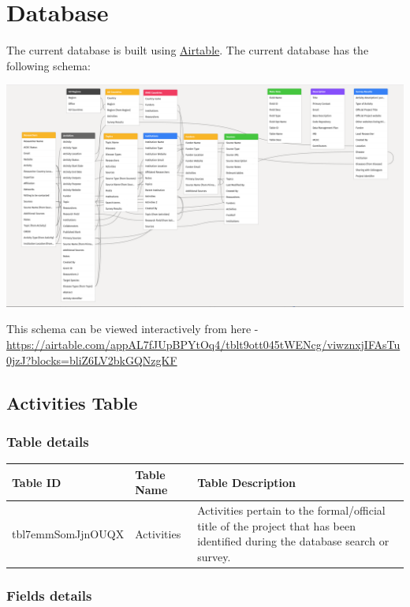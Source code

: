 \documentclass[
]{book}
\begin{document}
\hypertarget{database}{%
\chapter{Database}\label{database}}

The current database is built using \href{https://airtable.com}{Airtable}. The current database has the following schema:

\includegraphics{images/database_schema.png}

This schema can be viewed interactively from here - \url{https://airtable.com/appAL7fJUpBPYtOq4/tblt9ott045tWENcg/viwznxjIFAsTu0jzJ?blocks=bliZ6LV2bkGQNzgKF}

\hypertarget{activities-table}{%
\section{Activities Table}\label{activities-table}}

\hypertarget{table-details}{%
\subsection{Table details}\label{table-details}}

\begin{table}
\centering
\begin{tabular}{l|l|l}
\hline
\textbf{Table ID} & \textbf{Table Name} & \textbf{Table Description}\\
\hline
tbl7emmSomJjnOUQX & Activities & Activities pertain to the formal/official title of the project that has been identified during the database search or survey.\\
\hline
\end{tabular}
\end{table}

\hypertarget{fields-details}{%
\subsection{Fields details}\label{fields-details}}
\end{document}
